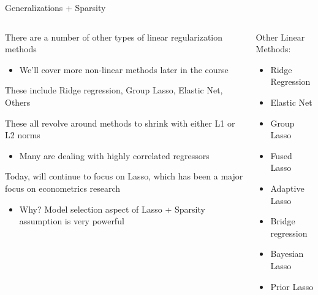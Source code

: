 \documentclass[notes,11pt, aspectratio=169]{beamer}
\newenvironment{wideitemize}{\itemize\addtolength{\itemsep}{10pt}}{\enditemize}
\begin{document}
\begin{frame}{Generalizations + Sparsity}
  \begin{columns}[T] %
    \begin{column}{.7\textwidth}
      \begin{wideitemize}
      \item There are a number of other types of linear regularization methods
        \begin{itemize}
        \item We'll cover more non-linear methods later in the course
        \end{itemize}
      \item These include Ridge regression, Group Lasso, Elastic Net, Others
      \item These all revolve around methods to shrink with either L1 or
        L2 norms
        \begin{itemize}
        \item Many are dealing with highly correlated regressors
        \end{itemize}
      \item Today, will continue to focus on Lasso, which has been a major
        focus on econometrics research
        \begin{itemize}
        \item Why? Model selection aspect of Lasso + Sparsity assumption is very powerful
        \end{itemize}
      \end{wideitemize}
    \end{column}
  \hfill%
  \begin{column}{.3\textwidth}
    Other Linear Methods:
    \begin{itemize}
    \item Ridge Regression
    \item Elastic Net
    \item Group Lasso
    \item Fused Lasso
    \item Adaptive Lasso
    \item Bridge regression
    \item Bayesian Lasso
      \item Prior Lasso
      \end{itemize}
  \end{column}
\end{columns}
\end{frame}
\end{document}
